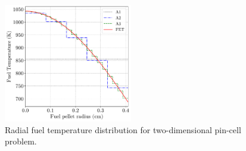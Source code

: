 \begin{figure}
      \centering
      \includegraphics[width=0.5\textwidth]{figs/pin_2d_temp.pdf}
      \caption{Radial fuel temperature distribution for two-dimensional pin-cell problem.}
      \label{fig_41}
\end{figure}

